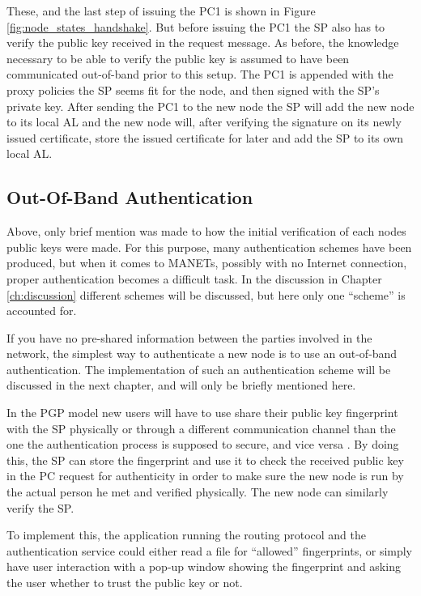 These, and the last step of issuing the \ac{PC1} is shown in Figure
\ref{fig:node_states_handshake}. But before issuing the \ac{PC1} the \ac{SP}
also has to verify the public key received in the request message. As before,
the knowledge necessary to be able to verify the public key is assumed to have been
communicated out-of-band prior to this setup. The \ac{PC1} is appended with the
proxy policies the \ac{SP} seems fit for the node, and then signed with the
\ac{SP}'s private key. After sending the \ac{PC1} to the new node the \ac{SP}
will add the new node to its local \ac{AL} and the new node will, after
verifying the signature on its newly issued certificate, store the issued
certificate for later and add the \ac{SP} to its own local \ac{AL}.

\subsection{Out-Of-Band Authentication}
Above, only brief mention was made to how the initial verification of each nodes
public keys were made. For this purpose, many authentication schemes have been
produced, but when it comes to \acp{MANET}, possibly with no Internet
connection, proper authentication becomes a difficult task. In the discussion
in Chapter \ref{ch:discussion} different schemes will be discussed, but here
only one ``scheme'' is accounted for.

If you have no pre-shared information between the parties involved in the
network, the simplest way to authenticate a new node is to use an out-of-band
authentication. The implementation of such an authentication scheme will be
discussed in the next chapter, and will only be briefly mentioned here.

In the PGP model new users will have to use share their public key fingerprint
with the \ac{SP} physically or through a different communication channel than
the one the authentication process is supposed to secure, and vice versa
\cite{zimmermann1995official}. By doing this, the \ac{SP} can store the
fingerprint and use it to check the received public key in the \ac{PC} request
for authenticity in order to make sure the new node is run by the actual person
he met and verified physically. The new node can similarly verify the \ac{SP}.

To implement this, the application running the routing protocol and the
authentication service could either read a file for ``allowed'' fingerprints, or
simply have user interaction with a pop-up window showing the fingerprint and
asking the user whether to trust the public key or not.

